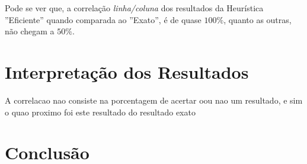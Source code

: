 \documentclass[a4paper, 12pt]{article}
\begin{document}
Pode se ver que, a correlação \textit{linha/coluna} dos resultados da Heurística ''Eficiente'' quando comparada ao ''Exato'', é de quase $100\%$,
quanto as outras, não chegam a $50\%$.

\section{Interpretação dos Resultados}
A correlacao nao consiste na porcentagem de acertar oou nao um resultado, e sim o quao proximo foi este resultado do resultado exato

\section{Conclusão}

{}

\end{document}
